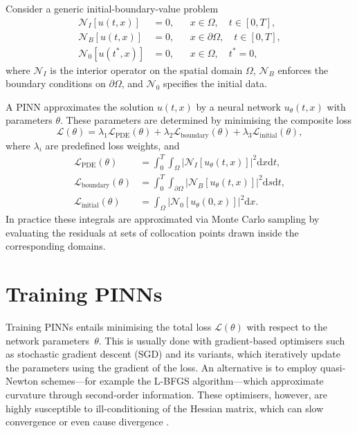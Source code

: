 \documentclass[12pt]{report} %
\theoremstyle{plain}           %
\theoremstyle{definition}      %
\theoremstyle{remark}          %
\begin{document}
Consider a generic initial-boundary-value problem
\begin{equation}
	\begin{aligned}
	\mathcal{N}_I[u(t,x)] &= 0, && x\in\Omega,\quad t\in [0,T], \\
	\mathcal{N}_B[u(t,x)] &= 0, && x\in\partial\Omega,\quad t\in [0,T], \\
	\mathcal{N}_0[u(t^*,x)] &= 0, && x\in\Omega,\quad t^*=0,
	\end{aligned}
	\label{eq:PDE_conditions}
\end{equation}
where \(\mathcal N_I\) is the interior operator on the spatial domain
\(\Omega\), \(\mathcal N_B\) enforces the boundary conditions on
\(\partial\Omega\), and \(\mathcal N_0\) specifies the initial data.

A PINN approximates the solution \(u(t,x)\) by a neural network
\(u_\theta(t,x)\) with parameters \(\theta\).  These parameters are determined
by minimising the composite loss
\begin{equation}
	\mathcal{L}(\theta) = \lambda_1 \mathcal{L}_{\text{PDE}}(\theta) + \lambda_2 \mathcal{L}_{\text{boundary}}(\theta) + \lambda_3 \mathcal{L}_{\text{initial}}(\theta),
	\label{eq:total_loss}
\end{equation}
where \(\lambda_i\) are predefined loss weights, and
\begin{equation}
	\begin{aligned}
		\mathcal{L}_{\text{PDE}}(\theta) &= \int_{0}^{T}\int_{\Omega}\left|\mathcal{N}_I[u_\theta(t,x)]\right|^2\mathrm{d}x\mathrm{d}t, \\
		\mathcal{L}_{\text{boundary}}(\theta) &= \int_{0}^{T}\int_{\partial\Omega}\left|\mathcal{N}_B[u_\theta(t,x)]\right|^2\mathrm{d}s\mathrm{d}t, \\
		\mathcal{L}_{\text{initial}}(\theta) &= \int_{\Omega}\left|\mathcal{N}_0[u_\theta(0,x)]\right|^2\mathrm{d}x.
	\end{aligned}
	\label{eq:loss_terms}
\end{equation}
In practice these integrals are approximated via Monte Carlo sampling by
evaluating the residuals at sets of collocation points drawn inside the
corresponding domains.

\section{Training PINNs}
Training PINNs entails minimising the total loss $\mathcal{L}(\theta)$ with
respect to the network parameters~$\theta$. This is usually done with
gradient-based optimisers such as stochastic gradient descent (SGD) and its
variants, which iteratively update the parameters using the gradient of the
loss. An alternative is to employ quasi-Newton schemes—for example the
L-BFGS algorithm—which approximate curvature through second-order information.
These optimisers, however, are highly susceptible to ill-conditioning of the
Hessian matrix, which can slow convergence or even cause divergence
\cite{Urb_n_2025}.
\end{document}
